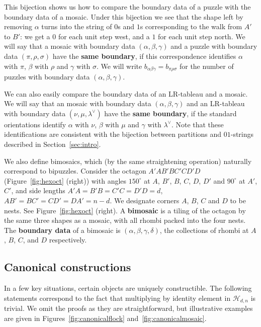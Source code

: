 \documentclass[12pt]{article}
\newcommand{\ringH}{\mathcal{H}_{d,n}}
\begin{document}
This bijection shows us how to compare the boundary data of a puzzle
with the boundary data of a mosaic.  Under this bijection we see that
the shape left by removing $\alpha$ turns into the string of $0$s and 
$1$s corresponding to the walk from $A'$ to $B'$: we get a $0$ for
each unit step west, and a $1$ for each unit step north.
We will say that a mosaic with boundary data 
$(\alpha, \beta, \gamma)$ 
and a puzzle with boundary data $(\pi,\rho, \sigma)$ have the 
{\bf same boundary}, if this correspondence identifies $\alpha$ with $\pi$,
$\beta$ with $\rho$ and $\gamma$ with $\sigma$.
We will write $b_{\alpha \beta \gamma} = b_{\pi \rho \sigma}$
for the number of puzzles with boundary data 
$(\alpha, \beta, \gamma)$.

We can also easily compare the boundary data of an LR-tableau and a 
mosaic.  We will say that an mosaic with boundary data 
$(\alpha, \beta, \gamma)$ and an LR-tableau with boundary
data $(\nu, \mu, \lambda^\vee)$ have the {\bf same boundary}, if the 
standard orientations identify $\alpha$ with $\nu$, $\beta$ with $\mu$
and $\gamma$ with $\lambda^\vee$.  Note that these identifications are
consistent with
the bijection between partitions and $01$-strings described in
Section~\ref{sec:intro}.

We also define bimosaics, which (by the same straightening
operation) naturally correspond to bipuzzles.
Consider the octagon $A'AB'BC'CD'D$ (Figure~\ref{fig:hexoct} (right))
with angles $150^\circ$ at $A$, $B'$, $B$, $C$, $D$, $D'$
and $90^\circ$ at $A'$, $C'$, and side lengths
$A'A = B'B = C'C = D'D = d$, $AB' = BC' = CD' = DA' = n-d$.
We designate corners $A$, $B$, $C$ and $D$ to be nests.  See 
Figure~\ref{fig:hexoct} (right).
A {\bf bimosaic} is a tiling of the octagon by the same
three shapes as a mosaic, with all rhombi packed into the four
nests.  The {\bf boundary data} of a bimosaic is
$(\alpha, \beta, \gamma, \delta)$, the collections of rhombi at 
$A$, $B$, $C$, and $D$ respectively.

\subsection{Canonical constructions}
In a few key situations, certain objects are uniquely constructible.  
The following statements correspond to the fact that multiplying
by identity element in $\ringH$ is trivial.
We omit the proofs as they are straightforward, but illustrative
examples are given in Figures~\ref{fig:canonicalflock} 
and~\ref{fig:canonicalmosaic}.
\end{document}
